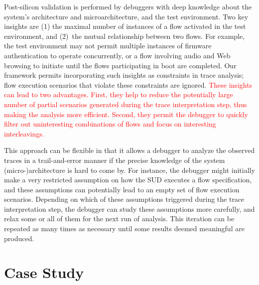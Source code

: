 \documentclass[conference]{IEEEtran}
\begin{document}
Post-silicon validation is performed by debuggers with deep
knowledge about the system's architecture and
microarchitecture, and the test environment.  Two key
insights are (1) the maximal number of instances of a flow
activated in the test environment, and (2)~the mutual
relationship between two flows.  For example, the test
environment may not permit multiple instances of firmware
authentication to operate concurrently, or a flow involving
audio and Web browsing to initiate until the flows
participating in boot are completed.  Our framework permits
incorporating such insights as constraints in trace
analysis; flow execution scenarios that violate these
constraints are ignored.  \textcolor{red}{These insights can lead to two advantages.
First, they help to reduce the potentially large number of partial
scenarios generated during the trace interpretation step, thus making 
the analysis more efficient.  Second, they permit the debugger
to quickly filter out uninteresting combinations of flows and focus on interesting
interleavings.}

This approach can be flexible in that it allows a debugger
to analyze the observed traces in a trail-and-error manner
if the precise knowledge of the system (micro-)architecture
is hard to come by.  For instance, the debugger might
initially make a very restricted assumption on how the SUD
executes a flow specification, and these assumptions can
potentially lead to an empty set of flow execution
scenarios.  Depending on which of these assumptions
triggered during the trace interpretation step, the debugger
can study these assumptions more carefully, and relax some
or all of them for the next run of analysis.  This iteration
can be repeated as many times as necessary until some
results deemed meaningful are produced.



  
%



%
%
\section{Case Study}
\end{document}
